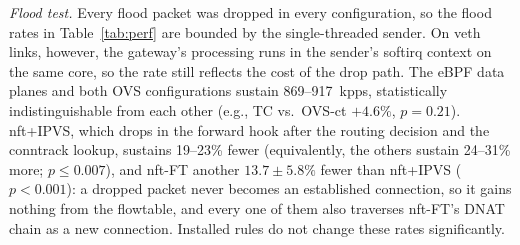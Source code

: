 \documentclass[conference]{IEEEtran}
\begin{document}
\begin{table}[t]
\caption{In-kernel cost per processing path with one installed rule (ns,
mean $\pm$ 95\% CI)}
\label{tab:paths}
\centering\scriptsize
\setlength{\tabcolsep}{1.6pt}
\end{table}

\textit{Flood test.} Every flood packet was dropped in every configuration,
so the flood rates in Table~\ref{tab:perf} are bounded by the single-threaded
sender. On veth links, however, the gateway's processing runs in the
sender's softirq context on the same core, so the rate still reflects the
cost of the drop path. The eBPF data planes and both OVS configurations
sustain 869--917~kpps, statistically indistinguishable from each other
(e.g., TC vs.\ OVS-ct $+4.6\%$, $p=0.21$). nft+IPVS, which drops in the
forward hook after the routing decision and the conntrack lookup, sustains
19--23\% fewer (equivalently, the others sustain 24--31\% more;
$p \le 0.007$), and nft-FT another $13.7 \pm 5.8\%$ fewer
than nft+IPVS ($p<0.001$): a dropped packet never becomes an established
connection, so it gains nothing from the flowtable, and every one of them
also traverses nft-FT's DNAT chain as a new connection. Installed rules do
not change these rates significantly.
\end{document}

